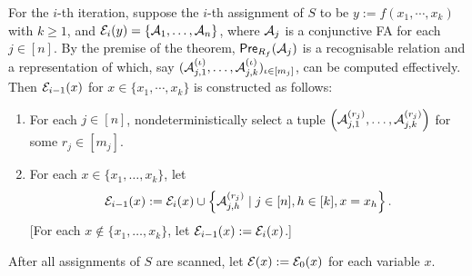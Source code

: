 For the $i$-th iteration, suppose the $i$-th assignment of $S$ to be $y:= f(x_1, \cdots, x_k)$ with $k\geq 1$, and  $\mathcal{E}_i(y)=\{\mathcal{A}_1, \ldots, \mathcal{A}_n\}$, 
where $\mathcal{A}_j$ is a conjunctive FA for each $j \in [n]$.
By the premise of the theorem, $\textsf{Pre}_{R_f}(\mathcal{A}_j)$ is a recognisable relation and a representation of which, say $(\mathcal{A}^{(\iota)}_{j, 1}, \ldots, \mathcal{A}^{(\iota)}_{j, k})_{\iota \in [m_j]}$, 
can be computed effectively. Then $\mathcal{E}_{i-1}(x)$ for $x \in  \{x_1,\cdots, x_k\}$ is constructed as follows: %
\begin{enumerate}
\item For each $j \in [n]$, nondeterministically select a tuple $\left(\mathcal{A}^{(r_j)}_{j, 1}, \ldots, \mathcal{A}^{(r_j)}_{j, k}\right)$ for some $r_j \in [m_j]$.
%
\item For each $x \in \{x_1,\ldots, x_k\}$, let
\[
    \mathcal{E}_{i-1}(x):= \mathcal{E}_{i}(x) \cup \left\{\mathcal{A}^{(r_j)}_{j, h} \mid  j \in [n], h \in [k], x = x_h \right\}.
\]
[For each $x{\notin} \{x_1,\ldots, x_k\}$, let $\mathcal{E}_{i-1}(x) := \mathcal{E}_i(x)$.]
%
\end{enumerate}
%
After all assignments of $S$ are scanned,  let $\mathcal{E}(x):=\mathcal{E}_{0}(x)$ for each variable $x$.



